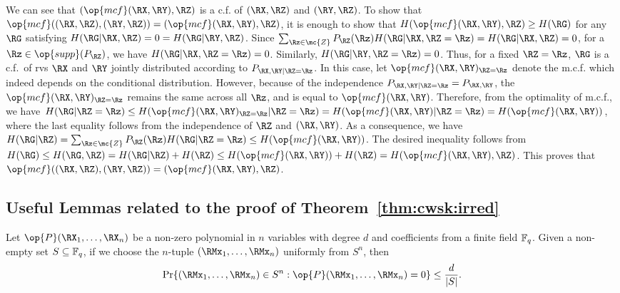  We can see that $ (\op{mcf}(\RX,\RY) ,\RZ)$ is a c.f. of $(\RX,\RZ)$ and $(\RY,\RZ)$. To show that $\op{mcf}((\RX,\RZ), (\RY,\RZ)) = (\op{mcf}(\RX,\RY), \RZ)$, it is enough to show that $H(\op{mcf}(\RX,\RY) ,\RZ) \geq H(\RG)$ for any $\RG$ satisfying $H(\RG|\RX,\RZ)=0=H(\RG|\RY,\RZ)$. Since $\sum_{\Rz \in \mc{Z}}P_{\RZ}(\Rz) H(\RG|\RX,\RZ=\Rz)=H(\RG|\RX,\RZ)=0$, for a $\Rz \in \op{supp}(P_{\RZ})$,  we have $H(\RG|\RX,\RZ=\Rz)=0$. Similarly, $H(\RG|\RY,\RZ=\Rz)=0$. Thus, for a fixed $\RZ =\Rz$, $\RG$ is a c.f.\ of rvs $\RX$ and $\RY$ jointly distributed according to $P_{\RX, \RY \mid \RZ=\Rz}$. In this case, let $\op{mcf}(\RX,\RY)_{\RZ=\Rz}$ denote the m.c.f. which indeed depends on the conditional distribution.  However, because of the independence $P_{\RX, \RY \mid \RZ=\Rz} =P_{\RX, \RY}$,  the $\op{mcf}(\RX,\RY)_{\RZ=\Rz}$ remains the same across all $\Rz$, and is equal to  $\op{mcf}(\RX,\RY)$. Therefore, from the optimality of m.c.f., we have $H(\RG |\RZ=\Rz) \leq  H(\op{mcf}(\RX,\RY)_{\RZ=\Rz} |\RZ=\Rz)=H(\op{mcf}(\RX,\RY) |\RZ=\Rz)= H(\op{mcf}(\RX,\RY))$, where the last equality follows from the independence of $\RZ$ and $(\RX,\RY)$. As a consequence, we have $H(\RG |\RZ) =\sum_{\Rz \in \mc{Z}}P_{\RZ}(\Rz) H(\RG|\RZ=\Rz)\leq H(\op{mcf}(\RX,\RY))$. The desired inequality follows from $H(\RG) \leq H(\RG,\RZ) =H(\RG |\RZ) + H(\RZ) \leq  H(\op{mcf}(\RX,\RY)) + H(\RZ) =H(\op{mcf}(\RX,\RY),\RZ)$.  This proves that $\op{mcf}((\RX,\RZ), (\RY,\RZ)) = (\op{mcf}(\RX,\RY), \RZ)$.

 \subsection{Useful Lemmas related to the proof of Theorem~\ref{thm:cwsk:irred}} \label{subsec:lemmas:irreducible}
\begin{lemma}\label{lem:sz}
Let $\op{P}(\RX_1,\ldots,\RX_n)$ be a non-zero polynomial in $n$ variables with degree $d$ and coefficients from a finite field $\mathbb{F}_q$. Given a non-empty set $S \subseteq \mathbb{F}_q$, if we choose the $n$-tuple $(\RMx_1, \ldots, \RMx_n)$ uniformly from $S^n$, then
\begin{align*}
\Pr \{(\RMx_1, \ldots, \RMx_n)\in S^n: \op{P}(\RMx_1, \ldots, \RMx_n) = 0\} \leq \frac{d}{|S|}.
\end{align*}
\end{lemma}

